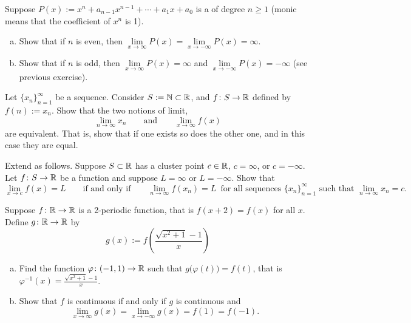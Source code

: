 \begin{exercise}
Suppose $P(x) := x^n + a_{n-1} x^{n-1} + \cdots + a_1 x + a_0$ is a \emph{}
of degree $n \geq 1$ (monic means that the coefficient of $x^n$ is 1).
\begin{enumerate}[a)]
\item
Show that if $n$ is even, then $\lim\limits_{x\to\infty} P(x) = 
\lim\limits_{x\to-\infty} P(x) = \infty$.
\item
Show that if $n$ is odd, then
$\lim\limits_{x\to\infty} P(x) = \infty$ and
$\lim\limits_{x\to-\infty} P(x) = -\infty$ (see previous exercise).
\end{enumerate}
\end{exercise}

\begin{exercise}
Let $\{ x_n \}_{n=1}^\infty$ be a sequence.  Consider $S := {\mathbb{N}} \subset {\mathbb{R}}$, and
$f \colon S \to {\mathbb{R}}$ defined by $f(n) := x_n$.  Show that
the two notions of limit,
\begin{equation*}
\lim_{n\to\infty} x_n \qquad \text{and} \qquad
\lim_{x\to\infty} f(x) 
\end{equation*}
are equivalent.  That is, show that if one exists so does
the other one, and in this case they are equal.
\end{exercise}

\begin{exercise}
Extend  as follows.
Suppose $S \subset {\mathbb{R}}$ has a cluster point $c \in {\mathbb{R}}$, $c = \infty$,
or $c = -\infty$.  Let $f \colon S \to {\mathbb{R}}$ be a function and suppose
$L = \infty$ or $L = -\infty$.  Show that
\begin{equation*}
\lim_{x\to c} f(x) = L \qquad \text{if and only if} \qquad
\lim_{n\to\infty} f(x_n) = L \enspace \text{for all sequences }
\{ x_n \}_{n=1}^\infty \text{ such that } \lim_{n\to\infty} x_n = c .
\end{equation*}
\end{exercise}

\begin{exercise}
Suppose $f \colon {\mathbb{R}} \to {\mathbb{R}}$ is a 2-periodic function, that is $f(x +2) =
f(x)$ for all $x$.  Define $g \colon {\mathbb{R}} \to {\mathbb{R}}$ by 
\begin{equation*}
g(x) := f\left(\frac{\sqrt{x^2+1}-1}{x}\right)
\end{equation*}
\begin{enumerate}[a)]
\item
Find the function $\varphi \colon (-1,1) \to {\mathbb{R}}$ such that
$g\bigl(\varphi(t)\bigr) = f(t)$, that is $\varphi^{-1}(x) = 
\frac{\sqrt{x^2+1}-1}{x}$.
\item
Show that $f$ is continuous if and only if $g$ is continuous and
\begin{equation*}
\lim_{x \to \infty} g(x) = 
\lim_{x \to -\infty} g(x) = 
f(1) = f(-1) .
\end{equation*}
\end{enumerate}
\end{exercise}

